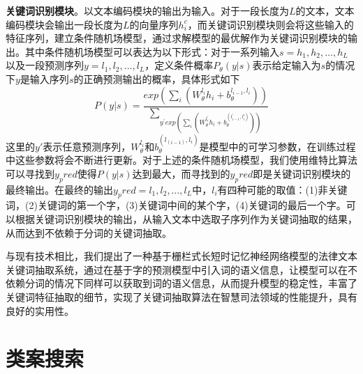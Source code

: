 \textbf{关键词识别模块}。以文本编码模块的输出为输入。对于一段长度为$L$的文本，文本编码模块会输出一段长度为$L$的向量序列$h_{i}^{c}$，而关键词识别模块则会将这些输入的特征序列，建立条件随机场模型，通过求解模型的最优解作为关键词识别模块的输出。其中条件随机场模型可以表达为以下形式：对于一系列输入$s=h_{1}, h_{2}, …, h_{L}$以及一段预测序列$y=l_{1},l_{2}, …, l_{L}$，定义条件概率$P_{\theta}(y|s)$表示给定输入为$s$的情况下$y$是输入序列$s$的正确预测输出的概率，具体形式如下
	\begin{equation}
		P(y|s) = \frac{exp(\sum_{i}(W_{\theta}^{l_i}h_{i} + b_{\theta}^{l_{i-1},l_{i}}))}{\sum_{y^{'}exp(\sum_{i}(W_{\theta}^{l_{i}^{'}}h_{i} + b_{\theta}^{(l_{i-1}^{'},l_{i}^{i})}))}}
	\end{equation}
	这里的$y'$表示任意预测序列，$W_{\theta}^{l_{i}}$和$b_{θ}^{(l_{(i-1)},l_{i})}$是模型中的可学习参数，在训练过程中这些参数将会不断进行更新。对于上述的条件随机场模型，我们使用维特比算法可以寻找到$y_pred$使得$P(y|s)$达到最大，而寻找到的$y_pred$即是关键词识别模块的最终输出。在最终的输出$y_pred = l_{1},l_{2}, …, l_{L}$中，$l_{i}$有四种可能的取值：(1)非关键词，(2)关键词的第一个字，(3)关键词中间的某个字，(4)关键词的最后一个字。可以根据关键词识别模块的输出，从输入文本中选取子序列作为关键词抽取的结果，从而达到不依赖于分词的关键词抽取。
	
	与现有技术相比，我们提出了一种基于栅栏式长短时记忆神经网络模型的法律文本关键词抽取系统，通过在基于字的预测模型中引入词的语义信息，让模型可以在不依赖分词的情况下同样可以获取到词的语义信息，从而提升模型的稳定性，丰富了关键词特征抽取的细节，实现了关键词抽取算法在智慧司法领域的性能提升，具有良好的实用性。








\section{类案搜索}

